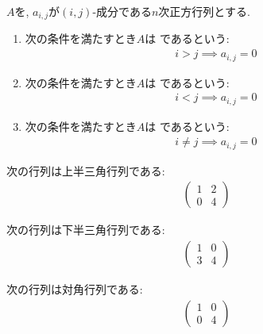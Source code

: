 \begin{definition}
  \label{def:triangular}
  $A$を, $a_{i,j}$が$(i,j)$-成分である$n$次正方行列とする.
  \begin{enumerate}
  \item
    次の条件を満たすとき$A$は
    であるという:
    \begin{align*}
      i>j\implies a_{i,j}=0
    \end{align*}
  \item
    次の条件を満たすとき$A$は
    であるという:
    \begin{align*}
      i<j\implies a_{i,j}=0
    \end{align*}
  \item
    次の条件を満たすとき$A$は
    であるという:
    \begin{align*}
      i\neq j\implies a_{i,j}=0
    \end{align*}
  \end{enumerate}
\end{definition}

\begin{example}
  次の行列は上半三角行列である:
  \begin{align*}
    \begin{pmatrix}
      1&2\\
      0&4
    \end{pmatrix}
  \end{align*}
\end{example}
\begin{example}
  次の行列は下半三角行列である:
  \begin{align*}
    \begin{pmatrix}
      1&0\\
      3&4
    \end{pmatrix}
  \end{align*}
\end{example}
\begin{example}
  次の行列は対角行列である:
  \begin{align*}
    \begin{pmatrix}
      1&0\\
      0&4
    \end{pmatrix}
  \end{align*}
\end{example}

